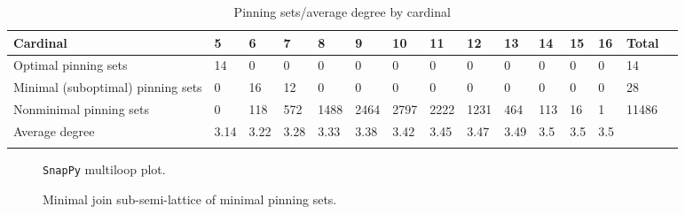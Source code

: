 \documentclass{article}%
\begin{document}
\begin{table}[ht]
	\caption{Pinning sets/average degree by cardinal}
	\centering
	\renewcommand{\arraystretch}{1.5}
	\begin{tabularx}{\textwidth}{lXXXXXXXXXXXXXX}
		\toprule
			Cardinal & 5 & 6 & 7 & 8 & 9 & 10 & 11 & 12 & 13 & 14 & 15 & 16 & Total\\
			\hline
			Optimal pinning sets & 14 & 0 & 0 & 0 & 0 & 0 & 0 & 0 & 0 & 0 & 0 & 0 & 14 \\
			Minimal (suboptimal) pinning sets & 0 & 16 & 12 & 0 & 0 & 0 & 0 & 0 & 0 & 0 & 0 & 0 & 28 \\
			Nonminimal pinning sets & 0 & 118 & 572 & 1488 & 2464 & 2797 & 2222 & 1231 & 464 & 113 & 16 & 1 & 11486 \\
			Average degree & 3.14 & 3.22 & 3.28 & 3.33 & 3.38 & 3.42 & 3.45 & 3.47 & 3.49 & 3.5 & 3.5 & 3.5 &  \\
		\bottomrule \\ 
	\end{tabularx}
\end{table}

\begin{multicols}{2}
\begin{figure}[H]
\centering

\caption{\texttt{SnapPy} multiloop plot.}
\label{fig:tex/img/[[22, 28, 1, 23], [23, 8, 24, 7], [21, 12, 22, 13], [27, 17, 28, 18], [1, 17, 2, 16], [8, 16, 9, 15], [24, 15, 25, 14], [6, 13, 7, 14], [20, 5, 21, 6], [11, 4, 12, 5], [18, 4, 19, 3], [26, 2, 27, 3], .svg}
\end{figure}
\columnbreak

\begin{figure}[H]
\centering
\scalebox{0.8}{}
\caption{Minimal join sub-semi-lattice of minimal pinning sets.}
\label{fig:tex/img/[[22, 28, 1, 23], [23, 8, 24, 7], [21, 12, 22, 13], [27, 17, 28, 18], [1, 17, 2, 16], [8, 16, 9, 15], [24, 15, 25, 14], [6, 13, 7, 14], [20, 5, 21, 6], [11, 4, 12, 5], [18, 4, 19, 3], [26, 2, 27, 3], .pgf}
\end{figure}
\end{multicols}
\end{document}

